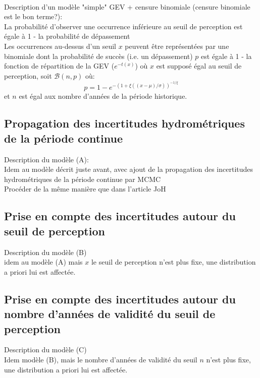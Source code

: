 \documentclass[11pt]{article}
\begin{document}
	\paragraph{}
	Description d'un modèle "simple" GEV + censure binomiale (censure binomiale est le bon terme?):\\
	La probabilité d'observer une occurrence inférieure au seuil de perception est égale à 1 -  la probabilité de dépassement\\
	Les occurrences au-dessus d'un seuil $x$ peuvent être représentées par une binomiale dont la probabilité de succès (i.e. un dépassement) $p$ est égale à 1 - la fonction de répartition de la GEV ($e^{-t(x)}$) où $x$ est supposé égal au seuil de perception, soit $\mathcal{B}(n,p)$ où:
	\begin{equation}
		p = 1 - e^{ -(1+\xi ((x-\mu)/\sigma))^{-1/\xi} }
	\end{equation}
	et $n$ est égal aux nombre d'années de la période historique.\\
	
	\subsection{Propagation des incertitudes hydrométriques de la période continue}
	Description du modèle (A): \\
	Idem au modèle décrit juste avant, avec ajout de la propagation des incertitudes hydrométriques de la période continue par MCMC\\
	Procéder de la même manière que dans l'article JoH
	
	\subsection{Prise en compte des incertitudes autour du seuil de perception}
	Description du modèle (B)\\
	idem au modèle (A) mais $x$ le seuil de perception n'est plus fixe, une distribution a priori lui est affectée. 
		
	\subsection{Prise en compte des incertitudes autour du nombre d'années de validité du seuil de perception}
	Description du modèle (C)\\
	Idem modèle (B), mais le nombre d'années de validité du seuil $n$ n'est plus fixe, une distribution a priori lui est affectée.\\
	
\end{document}
